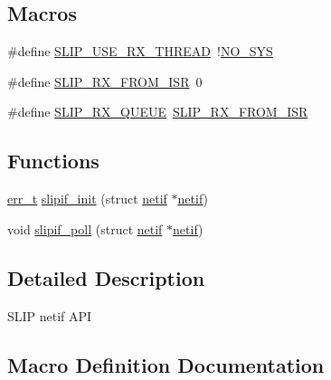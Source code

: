 \subsection*{Macros}
\begin{DoxyCompactItemize}
\item 
\#define \hyperlink{openmote-cc2538_2lwip_2src_2include_2netif_2slipif_8h_a198967c11f79cffc32192710294e8826}{S\+L\+I\+P\+\_\+\+U\+S\+E\+\_\+\+R\+X\+\_\+\+T\+H\+R\+E\+AD}~!\hyperlink{openmote-cc2538_2lwip_2test_2unit_2lwipopts_8h_ae00ba99de94a5bf84d832be8976df59b}{N\+O\+\_\+\+S\+YS}
\item 
\#define \hyperlink{openmote-cc2538_2lwip_2src_2include_2netif_2slipif_8h_a832eb1b9634b21aa0b91f78abfd852ea}{S\+L\+I\+P\+\_\+\+R\+X\+\_\+\+F\+R\+O\+M\+\_\+\+I\+SR}~0
\item 
\#define \hyperlink{openmote-cc2538_2lwip_2src_2include_2netif_2slipif_8h_a37ce8613535232db02bfd9ae9b51c668}{S\+L\+I\+P\+\_\+\+R\+X\+\_\+\+Q\+U\+E\+UE}~\hyperlink{openmote-cc2538_2lwip_2src_2include_2netif_2slipif_8h_a832eb1b9634b21aa0b91f78abfd852ea}{S\+L\+I\+P\+\_\+\+R\+X\+\_\+\+F\+R\+O\+M\+\_\+\+I\+SR}
\end{DoxyCompactItemize}
\subsection*{Functions}
\begin{DoxyCompactItemize}
\item 
\hyperlink{group__infrastructure__errors_gaf02d9da80fd66b4f986d2c53d7231ddb}{err\+\_\+t} \hyperlink{openmote-cc2538_2lwip_2src_2include_2netif_2slipif_8h_a687973ba82dab13a5b9d38d7399aeee3}{slipif\+\_\+init} (struct \hyperlink{structnetif}{netif} $\ast$\hyperlink{structnetif}{netif})
\item 
void \hyperlink{openmote-cc2538_2lwip_2src_2include_2netif_2slipif_8h_a7b036fd1cde9b299139cac62f52d15a6}{slipif\+\_\+poll} (struct \hyperlink{structnetif}{netif} $\ast$\hyperlink{structnetif}{netif})
\end{DoxyCompactItemize}


\subsection{Detailed Description}
S\+L\+IP netif A\+PI 

\subsection{Macro Definition Documentation}
\mbox{\label{openmote-cc2538_2lwip_2src_2include_2netif_2slipif_8h_a832eb1b9634b21aa0b91f78abfd852ea}} 
